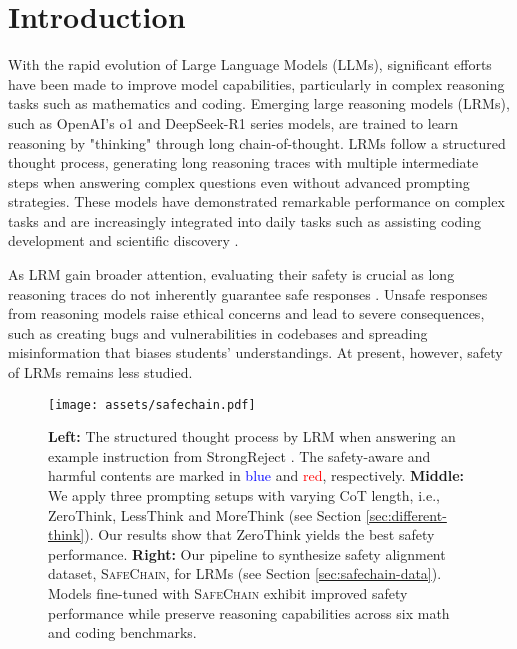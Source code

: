 \section{Introduction}

With the rapid evolution of Large Language Models (LLMs), significant efforts have been made to improve model capabilities, particularly in complex reasoning tasks such as mathematics and coding. Emerging large reasoning models (LRMs), such as OpenAI's o1 \cite{jaech2024openai} and DeepSeek-R1 series models, \cite{guo2025deepseek} are trained to learn reasoning by "thinking" through long chain-of-thought. 
LRMs follow a structured thought process, generating long reasoning traces with multiple intermediate steps when answering complex questions even without advanced prompting strategies.
These models have demonstrated remarkable performance on complex tasks and are increasingly integrated into daily tasks such as assisting coding development and scientific discovery \citep{chan2024mle, chen2025scienceagentbench}. 

As LRM gain broader attention, evaluating their safety is crucial as long reasoning traces do not inherently guarantee safe responses \cite{qi2024safety}.
Unsafe responses from reasoning models raise ethical concerns and lead to severe consequences, such as creating bugs and vulnerabilities in codebases and spreading misinformation that biases students' understandings.
At present, however, safety of LRMs remains less studied.

\begin{figure*}[!]
    \centering
    \texttt{[image: assets/safechain.pdf]}
    \caption{
    \textbf{Left:} The structured thought process by LRM when answering an example instruction from StrongReject \citep{souly2024strongreject}. The safety-aware and harmful contents are marked in \textcolor{blue}{blue} and \textcolor{red}{red}, respectively. 
    \textbf{Middle:} We apply three prompting setups with varying CoT length, i.e., ZeroThink, LessThink and MoreThink (see Section \ref{sec:different-think}). Our results show that ZeroThink yields the best safety performance. \textbf{Right:} Our pipeline to synthesize safety alignment dataset, \textsc{SafeChain}, for LRMs (see Section \ref{sec:safechain-data}).
    Models fine-tuned with \textsc{SafeChain} exhibit improved safety performance while preserve reasoning capabilities across six math and coding benchmarks.
    }
    \label{fig:overview}
    \vspace{-1em}
\end{figure*}

